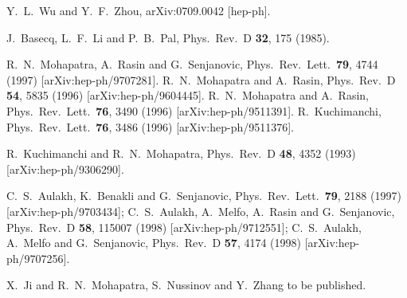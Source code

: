\documentclass[prd,aps,preprint,tightenlines,superscriptaddress]{revtex4}
\begin{document}
\begin{thebibliography}
  Y.~L.~Wu and Y.~F.~Zhou,
  arXiv:0709.0042 [hep-ph].

  J.~Basecq, L.~F.~Li and P.~B.~Pal,
  Phys.\ Rev.\  D {\bf 32}, 175 (1985).



R.~N.~Mohapatra, A.~Rasin and G.~Senjanovic,
  Phys.\ Rev.\ Lett.\  {\bf 79}, 4744 (1997)
  [arXiv:hep-ph/9707281].
R.~N.~Mohapatra and A.~Rasin,
  Phys.\ Rev.\  D {\bf 54}, 5835 (1996)
  [arXiv:hep-ph/9604445].
R.~N.~Mohapatra and A.~Rasin,
  Phys.\ Rev.\ Lett.\  {\bf 76}, 3490 (1996)
  [arXiv:hep-ph/9511391].
R.~Kuchimanchi,
  Phys.\ Rev.\ Lett.\  {\bf 76}, 3486 (1996)
  [arXiv:hep-ph/9511376].


R.~Kuchimanchi and R.~N.~Mohapatra,
  Phys.\ Rev.\  D {\bf 48}, 4352 (1993)
  [arXiv:hep-ph/9306290].
  

  C.~S.~Aulakh, K.~Benakli and G.~Senjanovic,
  Phys.\ Rev.\ Lett.\  {\bf 79}, 2188 (1997)
  [arXiv:hep-ph/9703434];
  C.~S.~Aulakh, A.~Melfo, A.~Rasin and G.~Senjanovic,
  Phys.\ Rev.\  D {\bf 58}, 115007 (1998)
  [arXiv:hep-ph/9712551];
  C.~S.~Aulakh, A.~Melfo and G.~Senjanovic,
  Phys.\ Rev.\  D {\bf 57}, 4174 (1998)
  [arXiv:hep-ph/9707256].
  
  

X.~Ji and R.~N.~Mohapatra, S.~Nussinov and Y.~Zhang to be published.  
  

\end{thebibliography}
\end{document}
